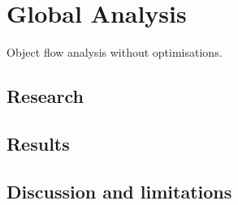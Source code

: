 \documentclass[../main.tex]{subfiles}
\begin{document}
    \section{Global Analysis}\label{sec:global_analysis}
        Object flow analysis without optimisations.
        
    \subsection{Research}\label{subsec:ga_research}

    \subsection{Results}\label{subsec:ga_results}

    \subsection{Discussion and limitations}\label{subsec:ga_discussion}
        
\end{document}
